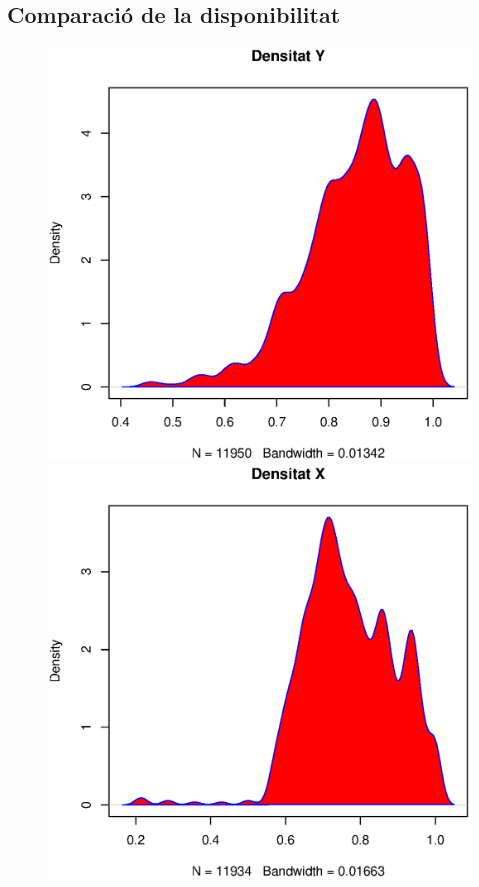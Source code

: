 \subsection{Comparació de la disponibilitat}


\begin{figure}[h!]
\begin{minipage}{0.5\linewidth}
\includegraphics[width=1\linewidth]{./images/no_DENS.eps}
\caption{}
\label{fig:densY}
\end{minipage}
\hfill
\begin{minipage}{0.5\linewidth}
\includegraphics[width=1\linewidth]{./images/si_DENS.eps}
\caption{}
\label{fig:densX}
\end{minipage}
\end{figure}
